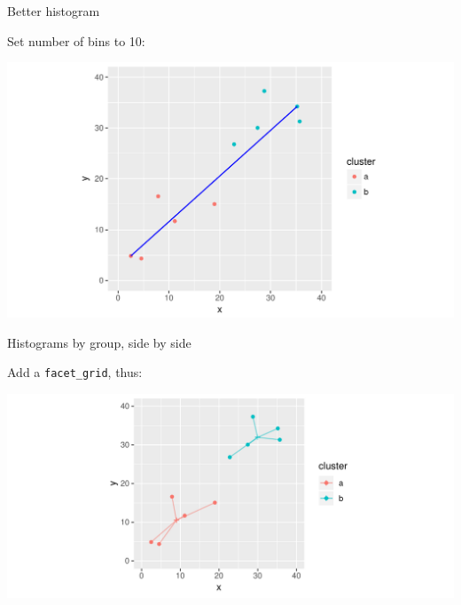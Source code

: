 \begin{frame}[fragile]{Better histogram}
  
  Set number of bins to 10:
  
\begin{knitrout}
\color{fgcolor}\begin{kframe}
\begin{alltt}
\hlstd{(}\hlopt{+}\hlstd{(}\hlstd{=}\hlstd{)}
\end{alltt}
\end{kframe}
\includegraphics[width=\maxwidth]{figure/unnamed-chunk-4-1} 

\end{knitrout}
  
\end{frame}

\begin{frame}[fragile]{Histograms by group, side by side}
  
  Add a \texttt{facet\_grid}, thus:

\begin{knitrout}
\color{fgcolor}\begin{kframe}
\begin{alltt}
\hlstd{(}\hlopt{+}\hlstd{(}\hlstd{=}\hlstd{)}\hlopt{+}
  \hlopt{~}
\end{alltt}
\end{kframe}
\includegraphics[width=\maxwidth]{figure/unnamed-chunk-5-1} 

\end{knitrout}
  
  
\end{frame}

